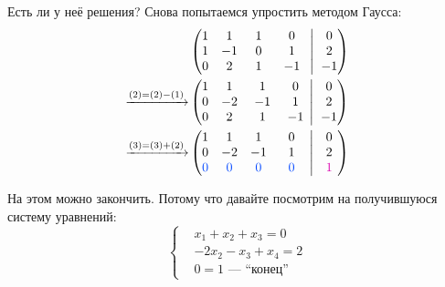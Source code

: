 \documentclass[a4paper,12pt]{article}
\newcommand{\BigMiddleThree}{\;\left|\vphantom{\begin{pmatrix} 0\\0\\0 \end{pmatrix}}\right.\;}
\newcommand{\lrhph}[2]{\hphantom{\makebox[#2][l]{}}#1\hphantom{\makebox[#2][l]{}}}
\begin{document}
  Есть ли у неё решения?
  Снова попытаемся упростить методом Гаусса:
  \begin{equation*}
  \begin{split}
    &\left(
      \begin{matrix}
        1 & 1 & \lrhph{1}{4pt} & \lrhph{0}{7pt}\\
        1 & -1 & 0 & 1\\
        0 & 2 & 1 & -1
      \end{matrix}
      \BigMiddleThree
      \begin{matrix}
        0\\
        2\\
        -1
      \end{matrix}
    \right)\\
    \xrightarrow{(2) = (2) - (1)} &\left(
      \begin{matrix}
        1 & 1 & 1 & 0\\
        0 & -2 & -1 & 1\\
        0 & 2 & \lrhph{1}{7pt} & {-1}
      \end{matrix}
      \BigMiddleThree
      \begin{matrix}
        0\\
        2\\
        -1
      \end{matrix}
    \right)\\
    \xrightarrow{(3) = (3) + (2)} &\left(
      \begin{matrix}
        1 & 1 & 1 & 0\\
        0 & -2 & -1 & 1\\
        \textcolor{blue}{0} & \textcolor{blue}{0} & \textcolor{blue}{0} & \lrhph{\textcolor{blue}{0}}{7pt}
      \end{matrix}
      \BigMiddleThree
      \begin{matrix}
        0\\
        2\\
        \lrhph{\textcolor{pink}{1}}{4pt}
      \end{matrix}
    \right)
  \end{split}
  \end{equation*}

  На этом можно закончить.
  Потому что давайте посмотрим на получившуюся систему уравнений:
  \[
    \left\{
      \begin{aligned}
        &x_1 + x_2 + x_3 = 0\\
        &-2x_2 - x_3 + x_4 = 2\\
        &\boxed{0 = 1} \mbox{\ ---~``конец''}
      \end{aligned}
    \right.
  \]
\end{document}
